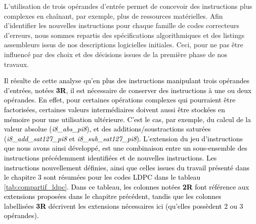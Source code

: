 \documentclass[../main.tex]{subfiles}
\begin{document}
L'utilisation de trois opérandes d'entrée permet de concevoir des instructions plus complexes en chaînant, par exemple, plus de ressources matérielles. 
Afin d'identifier les nouvelles instructions pour chaque famille de codes correcteurs d'erreurs, nous sommes repartis des spécifications algorithmiques et des listings assembleurs issus de nos descriptions logicielles initiales. 
Ceci, pour ne pas être influencé par des choix et des décisions issues de la première phase de nos travaux.

\textcolor{black}{Il résulte de cette analyse qu'en plus des instructions manipulant trois opérandes d'entrées, notées \textbf{3R}, il est nécessaire de conserver des instructions à une ou deux opérandes.
En effet, pour certaines opérations complexes qui pourraient être factorisées, certaines valeurs intermédiaires doivent aussi être stockées en mémoire pour une utilisation ultérieure. 
C'est le cas, par exemple, du calcul de la valeur absolue (\textit{i8\_abs\_pi8}), et des additions/soustractions saturées (\textit{i8\_add\_sat127\_pi8} et \textit{i8\_sub\_sat127\_pi8}). 
L'extension du jeu d'instructions que nous avons ainsi développé, est une combinaison entre un sous-ensemble des instructions précédemment identifiées et de nouvelles instructions. 
Les instructions nouvellement définies, ainsi que celles issues du travail présenté dans le chapitre 3 sont résumées pour les codes LDPC dans le tableau \ref{tab:compartif_ldpc}. 
Dans ce tableau, les colonnes notées \textbf{2R} font référence aux extensions proposées dans le chapitre précédent, tandis que les colonnes labellisées \textbf{3R} décrivent les extensions nécessaires ici (qu'elles possèdent 2 ou 3 opérandes).}
\end{document}

